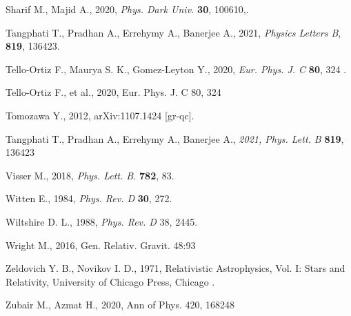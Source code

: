 \documentclass[]{aastex631}
\begin{document}
\begin{thebibliography}{99}
  Sharif M.,  Majid A.,  2020, {\em  Phys. Dark Univ.} {\bf  30}, 100610,.

  Tangphati T.,  Pradhan A., Errehymy A., Banerjee A.,  2021, {\em Physics Letters B}, {\bf 819},  136423.

  Tello-Ortiz F.,  Maurya S. K.,  Gomez-Leyton Y., 2020, {\em Eur. Phys. J. C} {\bf 80}, 324 .

 Tello-Ortiz F., et al., 2020, Eur. Phys. J. C 80, 324 

   Tomozawa Y., 2012, arXiv:1107.1424 [gr-qc].

  Tangphati T.,  Pradhan A.,  Errehymy A.,  Banerjee A., {\em 2021, Phys. Lett. B} {\bf 819}, 136423 

  Visser M.,  2018, {\em Phys. Lett. B.} {\bf  782},  83.

  Witten E.,  1984, {\em  Phys. Rev. D} {\bf 30}, 272. 

  Wiltshire D. L.,  1988, {\em Phys. Rev. D} {38}, 2445.

  Wright M., 2016, Gen. Relativ. Gravit.  48:93

  Zeldovich Y. B., Novikov I. D., 1971, Relativistic Astrophysics, Vol. I: Stars and Relativity, University of Chicago Press, Chicago .

 Zubair M.,  Azmat H., 2020, Ann of Phys. 420, 168248 

\end{thebibliography}
\end{document}
